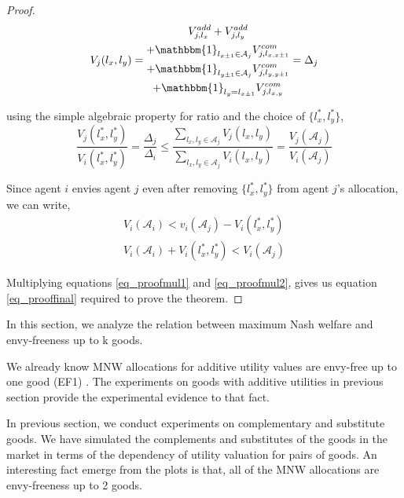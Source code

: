 \begin{proof}
\[
    V_j(l_x,l_y) = 
    \begin{gathered}
        V_{j,l_x}^{add} + V_{j,l_y}^{add} \\ 
        + \mathbbm{1}_{l_{x \pm 1} \in \mathcal{A}_j}V_{j,l_{x,x\pm 1}}^{com} \\
        + \mathbbm{1}_{l_{y \pm 1} \in \mathcal{A}_j}V_{j,l_{y,y\pm 1}}^{com} \\
        + \mathbbm{1}_{l_y = l_{x \pm 1}}V_{j,l_{x,y}}^{com}
    \end{gathered}
    = \Delta_j
\]

using the simple algebraic property for ratio and the choice of $\{l_x^*, l_y^*\}$,
\begin{equation}
\label{eq_proofmul1}
    \frac{V_j(l_x^*, l_y^*)}{V_i(l_x^*, l_y^*)} = \frac{\Delta_j}{\Delta_i} \leq \frac{\sum_{l_x,l_y \in \mathcal{A}_j}V_j(l_x,l_y)}{\sum_{l_x,l_y \in \mathcal{A}_j}V_i(l_x,l_y)} = \frac{V_j(\mathcal{A}_j)}{V_i(\mathcal{A}_j)}
\end{equation}

Since agent $i$ envies agent $j$ even after removing $\{l_x^*, l_y^*\}$ from agent $j$'s allocation, we can write,
\begin{equation}
\label{eq_proofmul2}
\begin{gathered}
    V_i(\mathcal{A}_i) < v_i(\mathcal{A}_j) - V_i(l_x^*, l_y^*) \\
    V_i(\mathcal{A}_i) + V_i(l_x^*, l_y^*) < V_i(\mathcal{A}_j)
\end{gathered}
\end{equation}

Multiplying equations \ref{eq_proofmul1} and \ref{eq_proofmul2}, gives us equation \ref{eq_prooffinal} required to prove the theorem.

\end{proof}

\hline



In this section, we analyze the relation between maximum Nash welfare and envy-freeness up to k goods.

We already know MNW allocations for additive utility values are envy-free up to one good (EF1) \cite{caragiannis2016unreasonable}. The experiments on goods with additive utilities in previous section provide the experimental evidence to that fact.

In previous section, we conduct experiments on complementary and substitute goods. We have simulated the complements and substitutes of the goods in the market in terms of the dependency of utility valuation for pairs of goods. An interesting fact emerge from the plots is that, all of the MNW allocations are envy-freeness up to 2 goods.

